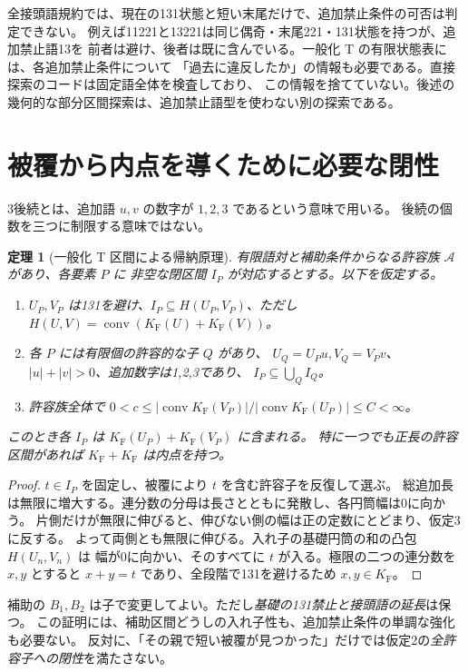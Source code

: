 \documentclass[10pt,a4paper]{article}
\newcommand{\KF}{K_{\mathrm F}}
\newcommand{\conv}{\operatorname{conv}}
\newtheorem{theorem}{定理}
\begin{document}
全接頭語規約では、現在の131状態と短い末尾だけで、追加禁止条件の可否は判定できない。
例えば11221と13221は同じ偶奇・末尾221・131状態を持つが、追加禁止語13を
前者は避け、後者は既に含んでいる。一般化 T の有限状態表には、各追加禁止条件について
「過去に違反したか」の情報も必要である。直接探索のコードは固定語全体を検査しており、
この情報を捨てていない。後述の幾何的な部分区間探索は、追加禁止語型を使わない別の探索である。

\section{被覆から内点を導くために必要な閉性}
3後続とは、追加語 $u,v$ の数字が $1,2,3$ であるという意味で用いる。
後続の個数を三つに制限する意味ではない。

\begin{theorem}[一般化 T 区間による帰納原理]\label{thm:cover}
有限語対と補助条件からなる許容族 $\mathcal A$ があり、各要素 $P$ に
非空な閉区間 $I_P$ が対応するとする。以下を仮定する。
\begin{enumerate}
\item $U_P,V_P$ は131を避け、$I_P\subseteq H(U_P,V_P)$、ただし
 $H(U,V)=\conv(\KF(U)+\KF(V))$。
\item 各 $P$ には有限個の許容的な子 $Q$ があり、
 $U_Q=U_Pu,V_Q=V_Pv$、$|u|+|v|>0$、追加数字は1,2,3であり、
 $I_P\subseteq\bigcup_Q I_Q$。
\item 許容族全体で $0<c\le |\conv\KF(V_P)|/|\conv\KF(U_P)|\le C<\infty$。
\end{enumerate}
このとき各 $I_P$ は $\KF(U_P)+\KF(V_P)$ に含まれる。
特に一つでも正長の許容区間があれば $\KF+\KF$ は内点を持つ。
\end{theorem}
\begin{proof}
$t\in I_P$ を固定し、被覆により $t$ を含む許容子を反復して選ぶ。
総追加長は無限に増大する。連分数の分母は長さとともに発散し、各円筒幅は0に向かう。
片側だけが無限に伸びると、伸びない側の幅は正の定数にとどまり、仮定3に反する。
よって両側とも無限に伸びる。入れ子の基礎円筒の和の凸包 $H(U_n,V_n)$ は
幅が0に向かい、そのすべてに $t$ が入る。極限の二つの連分数を $x,y$ とすると
$x+y=t$ であり、全段階で131を避けるため $x,y\in\KF$。
\end{proof}

補助の $B_1,B_2$ は子で変更してよい。ただし\emph{基礎の131禁止と接頭語の延長}は保つ。
この証明には、補助区間どうしの入れ子性も、追加禁止条件の単調な強化も必要ない。
反対に、「その親で短い被覆が見つかった」だけでは仮定2の\emph{全許容子への閉性}を満たさない。
\end{document}

